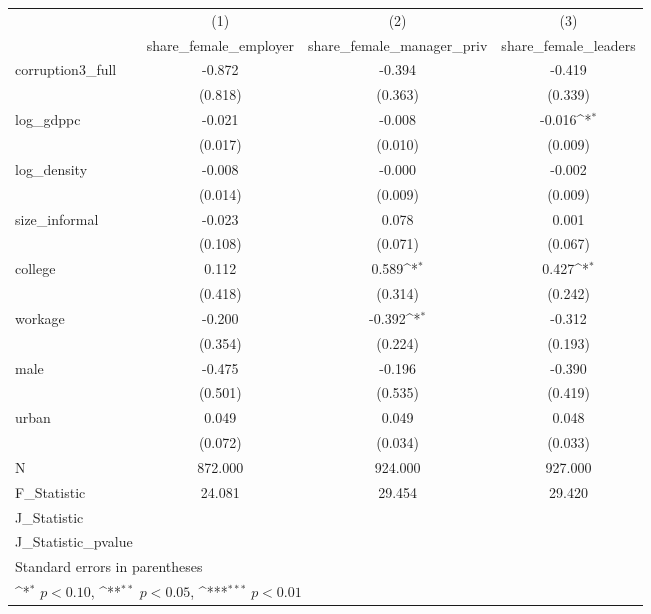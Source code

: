 {
\def\sym#1{\ifmmode^{#1}\else\(^{#1}\)\fi}
\begin{tabular}{l*{3}{c}}
\hline\hline
            &\multicolumn{1}{c}{(1)}&\multicolumn{1}{c}{(2)}&\multicolumn{1}{c}{(3)}\\
            &\multicolumn{1}{c}{share\_female\_employer}&\multicolumn{1}{c}{share\_female\_manager\_priv}&\multicolumn{1}{c}{share\_female\_leaders}\\
\hline
corruption3\_full&      -0.872         &      -0.394         &      -0.419         \\
            &     (0.818)         &     (0.363)         &     (0.339)         \\
[1em]
log\_gdppc   &      -0.021         &      -0.008         &      -0.016\sym{*}  \\
            &     (0.017)         &     (0.010)         &     (0.009)         \\
[1em]
log\_density &      -0.008         &      -0.000         &      -0.002         \\
            &     (0.014)         &     (0.009)         &     (0.009)         \\
[1em]
size\_informal&      -0.023         &       0.078         &       0.001         \\
            &     (0.108)         &     (0.071)         &     (0.067)         \\
[1em]
college     &       0.112         &       0.589\sym{*}  &       0.427\sym{*}  \\
            &     (0.418)         &     (0.314)         &     (0.242)         \\
[1em]
workage     &      -0.200         &      -0.392\sym{*}  &      -0.312         \\
            &     (0.354)         &     (0.224)         &     (0.193)         \\
[1em]
male        &      -0.475         &      -0.196         &      -0.390         \\
            &     (0.501)         &     (0.535)         &     (0.419)         \\
[1em]
urban       &       0.049         &       0.049         &       0.048         \\
            &     (0.072)         &     (0.034)         &     (0.033)         \\
\hline
N           &     872.000         &     924.000         &     927.000         \\
F\_Statistic &      24.081         &      29.454         &      29.420         \\
J\_Statistic &                     &                     &                     \\
J\_Statistic\_pvalue&                     &                     &                     \\
\hline\hline
\multicolumn{4}{l}{\footnotesize Standard errors in parentheses}\\
\multicolumn{4}{l}{\footnotesize \sym{*} \(p<0.10\), \sym{**} \(p<0.05\), \sym{***} \(p<0.01\)}\\
\end{tabular}
}
